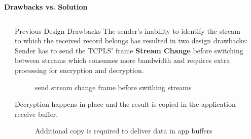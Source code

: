 \documentclass[final]{beamer}
\newlength{\sepwidth}
\newlength{\colwidth}
\newcommand{\separatorcolumn}{\begin{column}{\sepwidth}\end{column}}
\newcommand{\multicolumntitle}[1]{%
  \begin{center}
  \vspace{0.5cm} %
  {\bfseries \LARGE #1} %
  \vspace{0.5cm}
  \end{center}
}
\begin{document}
\begin{frame}[t]
\begin{columns}[t]
    \end{columns}

    \multicolumntitle{Drawbacks vs. Solution}
    \begin{columns}[t]
      \separatorcolumn
      \begin{column}{\colwidth}
        \begin{block}{Previous Design Drawbacks}
          The sender's inability to identify the stream to which the received record belongs has resulted in two design drawbacks:
          Sender has to send the TCPLS' frame \textbf{Stream Change} before switching between streams which consumes
          more bandwidth and requires extra processing for encryption and decryption.
          \begin{figure}
            \centering
            
            \caption{send stream change frame before swithing streams}
            \label{fig:schange}
          \end{figure}
          Decryption happens in place and the result is copied in the application receive buffer.
          \begin{figure}
            \centering
            
            \caption{Additional copy is required to deliver data in app buffers}
            \label{fig:inplace}
          \end{figure}
        \end{block}

      \end{column}
      \separatorcolumn




\end{columns}
\end{frame}
\end{document}
